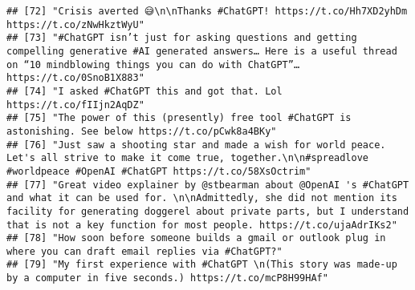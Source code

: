 \documentclass[
]{article}
\begin{document}
\begin{verbatim}
## [72] "Crisis averted 😅\n\nThanks #ChatGPT! https://t.co/Hh7XD2yhDm https://t.co/zNwHkztWyU"                                                                                                                                                                                                                                          
## [73] "#ChatGPT isn’t just for asking questions and getting compelling generative #AI generated answers… Here is a useful thread on “10 mindblowing things you can do with ChatGPT”… https://t.co/0SnoB1X883"                                                                                                                          
## [74] "I asked #ChatGPT this and got that. Lol https://t.co/fIIjn2AqDZ"                                                                                                                                                                                                                                                                
## [75] "The power of this (presently) free tool #ChatGPT is astonishing. See below https://t.co/pCwk8a4BKy"                                                                                                                                                                                                                             
## [76] "Just saw a shooting star and made a wish for world peace. Let's all strive to make it come true, together.\n\n#spreadlove #worldpeace #OpenAI #ChatGPT https://t.co/58XsOctrim"                                                                                                                                                 
## [77] "Great video explainer by @stbearman about @OpenAI 's #ChatGPT and what it can be used for. \n\nAdmittedly, she did not mention its facility for generating doggerel about private parts, but I understand that is not a key function for most people. https://t.co/ujaAdrIKs2"                                                  
## [78] "How soon before someone builds a gmail or outlook plug in where you can draft email replies via #ChatGPT?"                                                                                                                                                                                                                      
## [79] "My first experience with #ChatGPT \n(This story was made-up by a computer in five seconds.) https://t.co/mcP8H99HAf"                                                                                                                                                                                                            

\end{verbatim}
\end{document}

